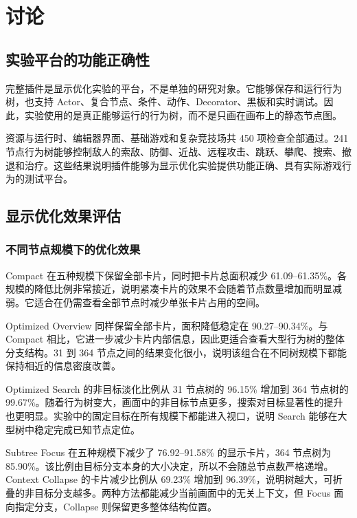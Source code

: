 \chapter{讨论}
\label{ch:discussion}

\section{实验平台的功能正确性}

完整插件是显示优化实验的平台，不是单独的研究对象。它能够保存和运行行为树，也支持 Actor、复合节点、条件、动作、Decorator、黑板和实时调试。因此，实验使用的是真正能够运行的行为树，而不是只画在画布上的静态节点图。

资源与运行时、编辑器界面、基础游戏和复杂竞技场共 450 项检查全部通过。241 节点行为树能够控制敌人的索敌、防御、近战、远程攻击、跳跃、攀爬、搜索、撤退和治疗。这些结果说明插件能够为显示优化实验提供功能正确、具有实际游戏行为的测试平台。

\section{显示优化效果评估}

\subsection{不同节点规模下的优化效果}

Compact 在五种规模下保留全部卡片，同时把卡片总面积减少 61.09--61.35\%。各规模的降低比例非常接近，说明紧凑卡片的效果不会随着节点数量增加而明显减弱。它适合在仍需查看全部节点时减少单张卡片占用的空间。

Optimized Overview 同样保留全部卡片，面积降低稳定在 90.27--90.34\%。与 Compact 相比，它进一步减少卡片内部信息，因此更适合查看大型行为树的整体分支结构。31 到 364 节点之间的结果变化很小，说明该组合在不同树规模下都能保持相近的信息密度改善。

Optimized Search 的非目标淡化比例从 31 节点树的 96.15\% 增加到 364 节点树的 99.67\%。随着行为树变大，画面中的非目标节点更多，搜索对目标显著性的提升也更明显。实验中的固定目标在所有规模下都能进入视口，说明 Search 能够在大型树中稳定完成已知节点定位。

Subtree Focus 在五种规模下减少了 76.92--91.58\% 的显示卡片，364 节点树为 85.90\%。该比例由目标分支本身的大小决定，所以不会随总节点数严格递增。Context Collapse 的卡片减少比例从 69.23\% 增加到 96.39\%，说明树越大，可折叠的非目标分支越多。两种方法都能减少当前画面中的无关上下文，但 Focus 面向指定分支，Collapse 则保留更多整体结构位置。

